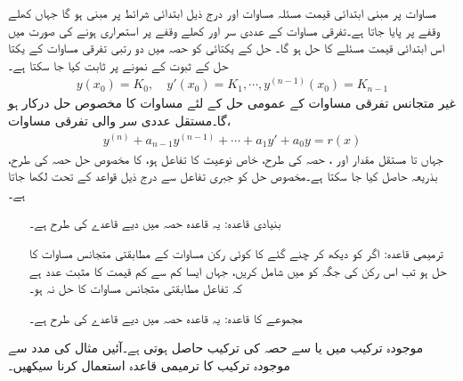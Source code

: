 مساوات  پر مبنی ابتدائی قیمت مسئلہ مساوات  اور درج ذیل  ابتدائی شرائط پر مبنی ہو گا جہاں  کھلے وقفے  پر پایا جاتا ہے۔تفرقی مساوات کے عددی سر اور  کھلے وقفے پر استمراری ہونے کی صورت میں اس ابتدائی قیمت مسئلے کا حل  ہو گا۔ حل کے یکتائی کو حصہ  میں دو رتبی تفرقی مساوات کے یکتا حل کے ثبوت کے نمونے پر ثابت کیا جا سکتا ہے۔
\begin{align}
y(x_0)=K_0, \quad y'(x_0)=K_1, \cdots , y^{(n-1)}(x_0)=K_{n-1}
\end{align}
غیر متجانس تفرقی مساوات  کے عمومی حل کے لئے مساوات  کا مخصوص حل درکار ہو گا۔مستقل عددی سر والی تفرقی مساوات،
\begin{align}\label{مساوات_سادہ_بلند_مستقل_عددی_سر_غیر_متجانس_الف}
y^{(n)}+a_{n-1}y^{(n-1)}+\cdots+a_1y'+a_0 y=r(x)
\end{align}
جہاں  تا  مستقل مقدار اور ، حصہ  کی طرح، خاص نوعیت کا تفاعل ہو، کا مخصوص حل  حصہ  کی طرح، بذریعہ  حاصل کیا جا سکتا ہے۔مخصوص حل  کو جبری تفاعل  سے درج ذیل قواعد کے تحت لکھا جاتا ہے۔
\begin{enumerate}
\item[بنیادی قاعدہ:]\label{قاعدہ_سادہ_بلند_بنیادی_قاعدہ}
یہ قاعدہ حصہ  میں دیے قاعدے  کی طرح ہے۔
\item[ترمیمی قاعدہ:]\label{قاعدہ_سادہ_بلند_ترمیمی_قاعدہ}
اگر  کو دیکھ کر چنے گئے   کا کوئی رکن   مساوات  کے  مطابقتی متجانس مساوات کا حل  ہو تب  اس رکن کی جگہ  کو   میں شامل کریں، جہاں  ایسا کم سے کم قیمت کا مثبت عدد ہے کہ تفاعل  مطابقتی متجانس مساوات کا حل نہ ہو۔
\item[مجموعے کا قاعدہ:]\label{قاعدہ_سادہ_بلند_مجموعہ_قاعدہ}
یہ قاعدہ حصہ  میں دیے قاعدے کی طرح ہے۔
\end{enumerate} 

موجودہ ترکیب میں  یا  سے حصہ  کی ترکیب حاصل ہوتی ہے۔آئیں مثال کی مدد سے موجودہ ترکیب کا ترمیمی قاعدہ  استعمال کرنا سیکھیں۔

